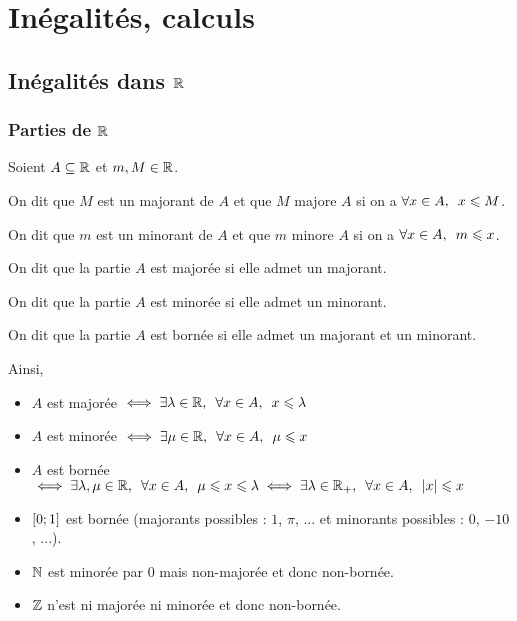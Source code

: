 \chapter{Inégalités, calculs}

\minitoc

\section{Inégalités dans \(\mathbb{R}\)}

\subsection{Parties de \(\mathbb{R}\)}

\begin{defi}
Soient \(A\subseteq\mathbb{R}\) et \(m,M\in\mathbb{R}\).

On dit que \(M\) est un majorant de \(A\) et que \(M\) majore \(A\) si on a \(\quantifs{\forall x\in A}x\leq M\).

On dit que \(m\) est un minorant de \(A\) et que \(m\) minore \(A\) si on a \(\quantifs{\forall x\in A}m\leq x\).

On dit que la partie \(A\) est majorée si elle admet un majorant.

On dit que la partie \(A\) est minorée si elle admet un minorant.

On dit que la partie \(A\) est bornée si elle admet un majorant et un minorant.

Ainsi, \begin{itemize}
\item \(A\) est majorée \(\ssi\quantifs{\exists\lambda\in\R;\forall x\in A}x\leq\lambda\)
\item \(A\) est minorée \(\ssi\quantifs{\exists\mu\in\R;\forall x\in A}\mu\leq x\)
\item \(A\) est bornée \(\ssi\quantifs{\exists\lambda,\mu\in\R;\forall x\in A}\mu\leq x\leq\lambda\ssi\quantifs{\exists\lambda\in\Rp;\forall x\in A}\abs{x}\leq x\)
\end{itemize}
\end{defi}

\begin{ex}
\begin{itemize}
\item \(\left[0;1\right]\) est bornée (majorants possibles : \(1\), \(\pi\), ... et minorants possibles : \(0\), \(-10\), ...).

\item \(\mathbb{N}\) est minorée par \(0\) mais non-majorée et donc non-bornée.

\item \(\mathbb{Z}\) n'est ni majorée ni minorée et donc non-bornée.
\end{itemize}
\end{ex}

